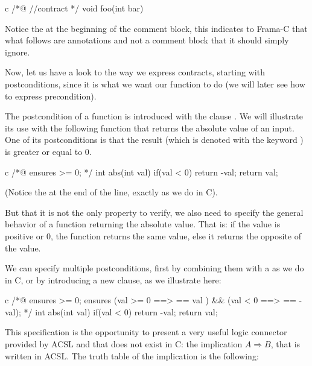 \documentclass[middle]{zmdocument}
\begin{document}
\begin{CodeBlock}{c}
/*@
  //contract
*/
void foo(int bar){

}
\end{CodeBlock}



Notice the  at the beginning of the comment block, this
indicates to Frama-C that what follows are annotations and not a comment
block that it should simply ignore.



Now, let us have a look to the way we express contracts, starting with
postconditions, since it is what we want our function to do (we will
later see how to express precondition).





The postcondition of a function is introduced with the clause . 
We will illustrate its use with the following function
that returns the absolute value of an input. One of its postconditions
is that the result (which is denoted with the keyword
) is greater or equal to 0.



\begin{CodeBlock}{c}
/*@
  ensures \result >= 0;
*/
int abs(int val){
  if(val < 0) return -val;
  return val;
}
\end{CodeBlock}


(Notice the \CodeInline{;} at the end of the line, exactly as we do in C).

But that it is not the only property to verify, we also need to specify
the general behavior of a function returning the absolute value. That
is: if the value is positive or 0, the function returns the same value,
else it returns the opposite of the value.

We can specify multiple postconditions, first by combining them with a
\CodeInline{\&\&} as we do in C, or by introducing a new 
clause, as we illustrate here:



\begin{CodeBlock}{c}
/*@
  ensures \result >= 0;
  ensures (val >= 0 ==> \result == val ) && 
          (val <  0 ==> \result == -val);
*/
int abs(int val){
  if(val < 0) return -val;
  return val;
}
\end{CodeBlock}



This specification is the opportunity to present a very useful logic
connector provided by ACSL and that does not exist in C: the implication
$A \Rightarrow B$, that is written  in
ACSL. The truth table of the implication is the following:
\end{document}

